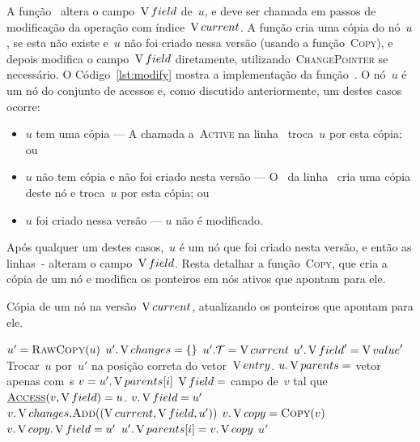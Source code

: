 \documentclass[main.tex]{subfiles}
\begin{document}
A função~ altera o campo~$\operatorname{V}{field}$ de~$u$, e deve ser chamada em passos de modificação da operação com índice~$\operatorname{V}{current}$. A função cria uma cópia do nó~$u$, se esta não existe e~$u$ não foi criado nessa versão (usando a função~\textsc{Copy}), e depois modifica o campo~$\operatorname{V}{field}$ diretamente, utilizando~\textsc{ChangePointer} se necessário.
O Código~\ref{lst:modify} mostra a implementação da função~. O nó~$u$ é um nó do conjunto de acessos e, como discutido anteriormente, um destes casos ocorre:
\begin{itemize}
	\item $u$ tem uma cópia --- A chamada a~\textsc{Active} na linha~ troca~$u$ por esta cópia; ou
	\item $u$ não tem cópia e não foi criado nesta versão --- O~ da linha~ cria uma cópia deste nó e troca~$u$ por esta cópia; ou
	\item $u$ foi criado nessa versão --- $u$ não é modificado.
\end{itemize}

Após qualquer um destes casos,~$u$ é um nó que foi criado nesta versão, e então as linhas~- alteram o campo~$\operatorname{V}{field}$.
Resta detalhar a função~\textsc{Copy}, que cria a cópia de um nó e modifica os ponteiros em nós ativos que apontam para ele.

\begin{algorithm}
\caption{Cópia de um nó na versão~$\operatorname{V}{current}$, atualizando os ponteiros que apontam para ele.} \label{lst:nc_copy}
\begin{algorithmic}[1]

	\State $u' = \Call{RawCopy}{u}$ 
	\State $u'.\operatorname{V}{changes} = \{\}$ \label{line:copy:chngb} 
	\State $u'.\mathcal{T} = \operatorname{V}{current}$
		\State $u'.\operatorname{V}{field}' = \operatorname{V}{value}'$
	\EndFor \label{line:copy:chnge}
	 \label{line:copy:if1}
		\State Trocar~$u$ por~$u'$ na posição correta do vetor~$\operatorname{V}{entry}$.
	\EndIf
	 \label{line:copy:for1}
			\State {}
		\EndIf
	\EndFor
	\State $u.\operatorname{V}{parents} = $ vetor apenas com~s
	 \label{line:copy:parents}
		\State $v = u'.\operatorname{V}{parents}[i]$
			\State $\operatorname{V}{field} = $ campo de~$v$ tal que~$\mbox{\textsc{\underline{Access}}\ensuremath{(v, \operatorname{V}{field})}} = u$.
				\State $v.\operatorname{V}{field} = u'$
				\State $v.\V{changes}.\Call{Add}{(\cur, \V{field}, u')}$ \label{line:copy:changes}
			\Else
				\State $v.\cp = \Call{Copy}{v}$ \label{line:copy:copy}
				\State $v.\operatorname{V}{copy}.\operatorname{V}{field} = u'$
				\State $u'.\operatorname{V}{parents}[i] = v.\operatorname{V}{copy}$
			\EndIf
		\EndIf
	\EndFor
	\State \Return $u'$
\EndFunction

\end{algorithmic}
\end{algorithm}
\end{document}
